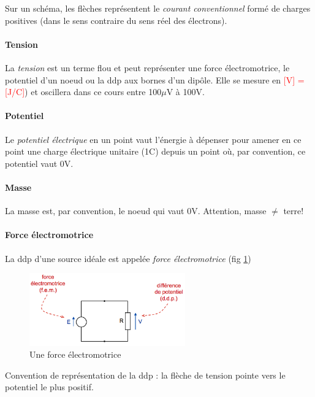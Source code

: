 \documentclass[a4paper]{article}
\begin{document}
    Sur un schéma, les flèches représentent le \textit{courant conventionnel} formé
    de charges positives (dans le sens contraire du sens réel des électrons).

    \paragraph{Tension} La \textit{tension} est un terme flou et peut représenter 
    une force électromotrice, le potentiel d'un noeud ou la ddp aux bornes d'un dipôle.
    Elle se mesure en \textcolor{red}{[V] = [J/C]}) et oscillera dans ce cours entre 
    100$\mu$V à 100V.

    \paragraph{Potentiel} Le \textit{potentiel électrique} en un point vaut l'énergie
    à dépenser pour amener en ce point une charge électrique unitaire (1C) depuis
    un point où, par convention, ce potentiel vaut 0V.

    \paragraph{Masse} La masse est, par convention, le noeud qui vaut 0V. Attention, 
    masse $\neq$ terre! 

    \paragraph{Force électromotrice} La ddp d'une source idéale est appelée \textit{force électromotrice} (fig \ref{fig:fem})

    \begin{figure}[H]
        \begin{center}
            \includegraphics[width=0.6\textwidth]{fig/2_fem.png}
            \caption{Une force électromotrice}
            \label{fig:fem}
        \end{center}
    \end{figure}

    Convention de représentation de la ddp : la flèche de tension pointe vers le
    potentiel le plus positif.
\end{document}
